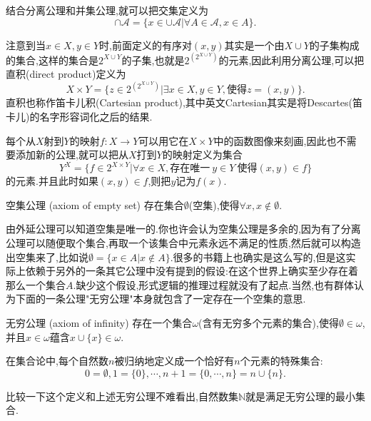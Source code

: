 \documentclass[12pt]{article}
\newcommand{\myind}[1]{{\upshape\color{blue} #1 }\index{#1}}
\begin{document}
结合分离公理和并集公理,就可以把交集定义为
\begin{equation}
\cap \mathcal{A} = \{x\in\cup\mathcal{A}|\forall A\in\mathcal{A},x\in A \}.
\end{equation}

注意到当$x\in X,y\in Y$时,前面定义的有序对$(x,y)$其实是一个由$X\cup Y$的子集构成的集合,这样的集合是$2^{X\cup Y}$的子集,也就是$2^{(2^{X\cup Y})}$的元素,因此利用分离公理,可以把直积(direct product)定义为
\begin{equation}
X\times Y = \{ z\in 2^{(2^{X\cup Y})}| \exists x\in X,y\in Y,\text{使得}z=(x,y) \}.
\end{equation}
直积也称作笛卡儿积(Cartesian product),其中英文Cartesian其实是将Descartes(笛卡儿)的名字形容词化之后的结果.

每个从$X$射到$Y$的映射$f:X\rightarrow Y$可以用它在$X\times Y$中的函数图像来刻画,因此也不需要添加新的公理,就可以把从$X$打到$Y$的映射定义为集合
\begin{equation}
Y^X = \{f\in 2^{X\times Y} | \forall x\in X,\text{存在唯一}\ y\in Y\ \text{使得}(x,y)\in f \}
\end{equation}
的元素.并且此时如果$(x,y)\in f$,则把$y$记为$f(x)$.

\myind{空集公理}(axiom of empty set) 存在集合$\emptyset$(空集),使得$\forall x,x\notin \emptyset$.

由外延公理可以知道空集是唯一的.你也许会认为空集公理是多余的,因为有了分离公理可以随便取个集合,再取一个该集合中元素永远不满足的性质,然后就可以构造出空集来了,比如说$\emptyset=\{x\in A|x\notin A\}$.很多的书籍上也确实是这么写的,但是这实际上依赖于另外的一条其它公理中没有提到的假设:在这个世界上确实至少存在着那么一个集合$A$.缺少这个假设,形式逻辑的推理过程就没有了起点.当然,也有群体认为下面的一条公理"无穷公理"本身就包含了一定存在一个空集的意思.


\myind{无穷公理}(axiom of infinity) 存在一个集合$\omega$(含有无穷多个元素的集合),使得$\emptyset\in\omega$,并且$x\in\omega$蕴含$x\cup\{x\}\in\omega$.

在集合论中,每个自然数$n$被归纳地定义成一个恰好有$n$个元素的特殊集合:
\begin{equation}
0=\emptyset,1=\{0\},\cdots,n+1=\{0,\cdots,n\} = n\cup\{n\}.
\end{equation}	

比较一下这个定义和上述无穷公理不难看出,自然数集$\mathbb{N}$就是满足无穷公理的最小集合.
\end{document}
